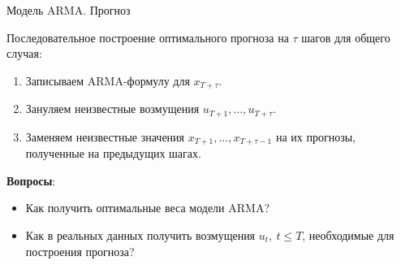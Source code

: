 \begin{frame}{Модель ARMA. Прогноз}

Последовательное построение оптимального прогноза на $\tau$ шагов для общего случая:
\begin{enumerate}
    \item Записываем ARMA-формулу для $x_{T+\tau}$.
    \item Зануляем неизвестные возмущения $u_{T+1}, ..., u_{T+\tau}$.
    \item Заменяем неизвестные значения $x_{T+1}, ..., x_{T+\tau - 1}$ на их прогнозы, полученные на предыдущих шагах.
\end{enumerate}

\textbf{Вопросы}:
\begin{itemize}
    \item Как получить оптимальные веса модели ARMA?
    \item Как в реальных данных получить возмущения $u_t, \ t \leq T$, необходимые для построения прогноза? 
\end{itemize}

\end{frame}


